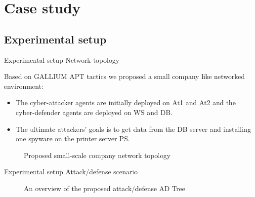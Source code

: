 \AtBeginSection[]{
	\begin{frame}
		\frametitle{}
		\tableofcontents[currentsection]
	\end{frame}
}

 
 \section{Case study}
	
	\subsection{Experimental setup}
	\begin{frame}{Experimental setup}
		{Network topology}

        Based on GALLIUM APT tactics we proposed a small company like networked environment:
        \begin{itemize}
            \item The cyber-attacker agents are initially deployed on At1 and At2 and the cyber-defender agents are deployed on WS and DB.
            \item The ultimate attackers' goals is to get data from the DB server and installing one spyware on the printer server PS.
        \end{itemize}

        \begin{figure}
            \centering
            
            \caption{Proposed small-scale company network topology}
            \label{fig:scenario_network_topology}
        \end{figure}
 
	\end{frame}

    
	\begin{frame}{Experimental setup}
		{Attack/defense scenario}

        \vspace{-0.15cm}

        \begin{figure}
            \centering
            

            \vspace{-0.2cm}
            
            \caption{An overview of the proposed attack/defense AD Tree}
            \label{fig:ADTree}
        \end{figure}
 
	\end{frame}


